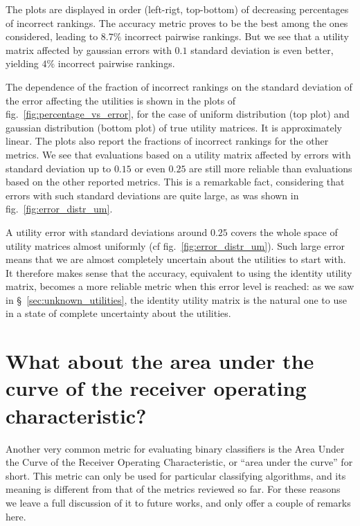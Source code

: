 \documentclass[\ifafour a4paper,12pt,\else a5paper,10pt,\fi%
onecolumn,oneside,article,%
british%
]{memoir}
\theoremstyle{remark}
\theoremstyle{innote}
\renewcommand*{\|}[1][]{\nonscript\:#1\vert\nonscript\:\mathopen{}}
\newcommand*{\sect}{\S}%
\newcommand*{\fig}{fig.}%
\begin{document}
The plots are displayed in order (left-rigt, top-bottom) of decreasing percentages of incorrect rankings. The accuracy metric proves to be the best among the ones considered, leading to $8.7\%$ incorrect pairwise rankings. But we see that a utility matrix affected by gaussian errors with $0.1$ standard deviation is even better, yielding $4\%$ incorrect pairwise rankings.

The dependence of the fraction of incorrect rankings on the standard deviation of the error affecting the utilities is shown in the plots of \fig~\ref{fig:percentage_vs_error}, for the case of uniform distribution (top plot) and gaussian distribution (bottom plot) of true utility matrices. It is approximately linear. The plots also report the fractions of incorrect rankings for the other metrics. We see that evaluations based on a utility matrix affected by errors with standard deviation up to $0.15$ or even $0.25$ are still more reliable than evaluations based on the other reported metrics. This is a remarkable fact, considering that errors with such standard deviations are quite large, as was shown in \fig~\ref{fig:error_distr_um}.

A utility error with standard deviations around $0.25$ covers the whole space of utility matrices almost uniformly (cf \fig~\ref{fig:error_distr_um}). Such large error means that we are almost completely uncertain about the utilities to start with. It therefore makes sense that the accuracy, equivalent to using the identity utility matrix, becomes a more reliable metric when this error level is reached: as we saw in \sect~\ref{sec:unknown_utilities}, the identity utility matrix is the natural one to use in a state of complete uncertainty about the utilities.


\section{What about the area under the curve of the receiver operating characteristic?}
\label{sec:auc}

Another very common metric for evaluating binary classifiers is the Area Under the Curve of the Receiver Operating Characteristic, or \enquote{area under the curve} for short. This metric can only be used for particular classifying algorithms, and its meaning is different from that of the metrics reviewed so far. For these reasons we leave a full discussion of it to future works, and only offer a couple of remarks here.
\end{document}
